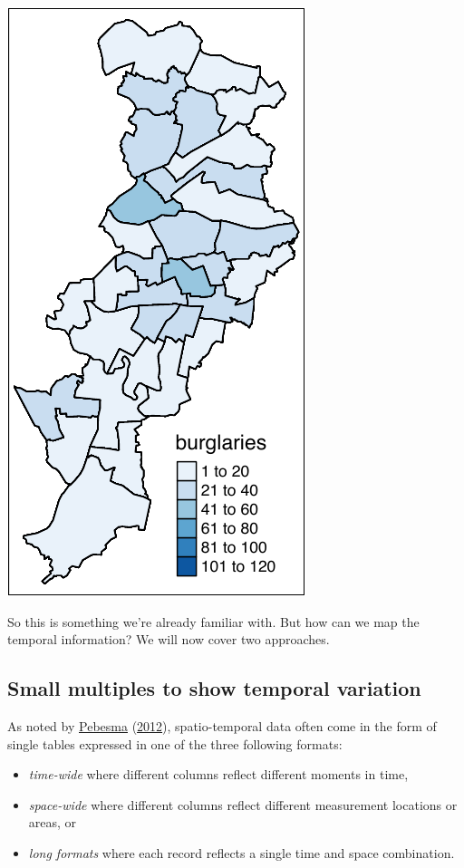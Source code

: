 \documentclass[
]{book}
\providecommand{\tightlist}{%
  \setlength{\itemsep}{0pt}\setlength{\parskip}{0pt}}
\begin{document}
\includegraphics{crime_mapping_files/figure-latex/unnamed-chunk-179-1.pdf}

So this is something we're already familiar with. But how can we map the temporal information? We will now cover two approaches.

\hypertarget{small-multiples-to-show-temporal-variation}{%
\subsection{Small multiples to show temporal variation}\label{small-multiples-to-show-temporal-variation}}

As noted by \protect\hyperlink{ref-Pebesma_2012}{Pebesma} (\protect\hyperlink{ref-Pebesma_2012}{2012}), spatio-temporal data often come in the form of single tables expressed in one of the three following formats:

\begin{itemize}
\tightlist
\item
  \emph{time-wide} where different columns reflect different moments in time,
\item
  \emph{space-wide} where different columns reflect different measurement locations or areas, or
\item
  \emph{long formats} where each record reflects a single time and space combination.
\end{itemize}
\end{document}
